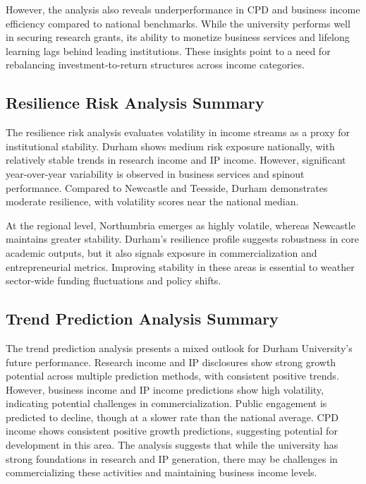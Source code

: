 \documentclass[journal,onecolumn, 10pt,draftclsnofoot]{IEEEtran}
\begin{document}
However, the analysis also reveals underperformance in CPD and business income efficiency compared to national benchmarks. While the university performs well in securing research grants, its ability to monetize business services and lifelong learning lags behind leading institutions. These insights point to a need for rebalancing investment-to-return structures across income categories.

\subsection{Resilience Risk Analysis Summary}

The resilience risk analysis evaluates volatility in income streams as a proxy for institutional stability. Durham shows medium risk exposure nationally, with relatively stable trends in research income and IP income. However, significant year-over-year variability is observed in business services and spinout performance. Compared to Newcastle and Teesside, Durham demonstrates moderate resilience, with volatility scores near the national median.

At the regional level, Northumbria emerges as highly volatile, whereas Newcastle maintains greater stability. Durham's resilience profile suggests robustness in core academic outputs, but it also signals exposure in commercialization and entrepreneurial metrics. Improving stability in these areas is essential to weather sector-wide funding fluctuations and policy shifts.

\subsection{Trend Prediction Analysis Summary}

The trend prediction analysis presents a mixed outlook for Durham University's future performance. Research income and IP disclosures show strong growth potential across multiple prediction methods, with consistent positive trends. However, business income and IP income predictions show high volatility, indicating potential challenges in commercialization. Public engagement is predicted to decline, though at a slower rate than the national average. CPD income shows consistent positive growth predictions, suggesting potential for development in this area. The analysis suggests that while the university has strong foundations in research and IP generation, there may be challenges in commercializing these activities and maintaining business income levels.
\end{document}
